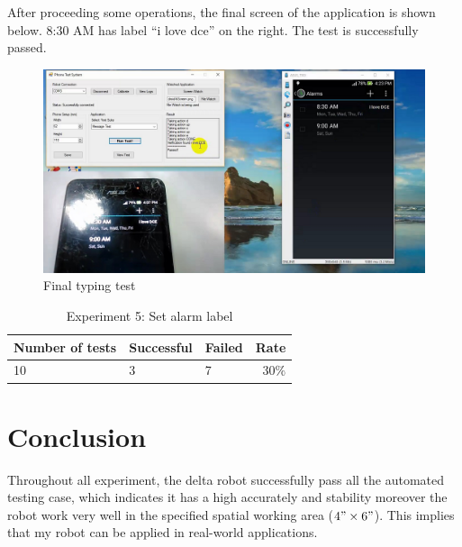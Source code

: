 After proceeding some operations, the final screen of the application is shown below. 8:30 AM has label ``i love dce'' on the right. The test is successfully passed.

	\begin{figure}[H]
		\centering
		\includegraphics[scale=0.5]{Chapters/Fig/label_final.png}
		\caption{Final typing test}
		\label{fig:label_final}
	\end{figure}

\begin{table}[H]
	\centering
	\caption{Experiment 5: Set alarm label}	
	\label{tab:exp3_result_stat}
	\begin{tabular}{|lll|r|}
		\hline
		\textbf{Number of tests} & \textbf{Successful} & \textbf{Failed} & \textbf{Rate} \\
		\hline
		10 & 3 & 7 & 30$\%$\\
		\hline
	\end{tabular}
\end{table}



\section{Conclusion}
Throughout all experiment, the delta robot successfully pass all the automated testing case, which indicates it has a high accurately and stability moreover the robot work very well in the specified spatial working area ($4"\times6"$). This implies that my robot can be applied in real-world applications.

